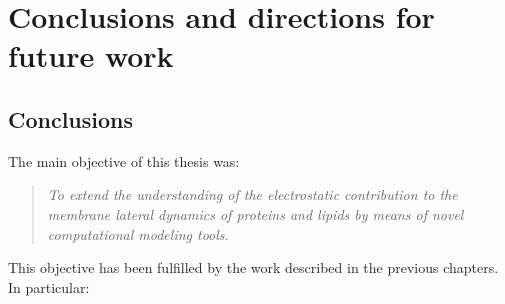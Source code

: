 \chapter{Conclusions and directions for future work}

\section{Conclusions}

The main objective of this thesis was:

\begin{quotation}
\begin{spacing}{1.0}
\emph{To extend the understanding of the electrostatic contribution to the membrane lateral dynamics of proteins and lipids by means of novel computational modeling tools.}
\end{spacing}
\end{quotation}

\vspace{-0.23in}

This objective has been fulfilled by the work described in the previous chapters. In particular:

